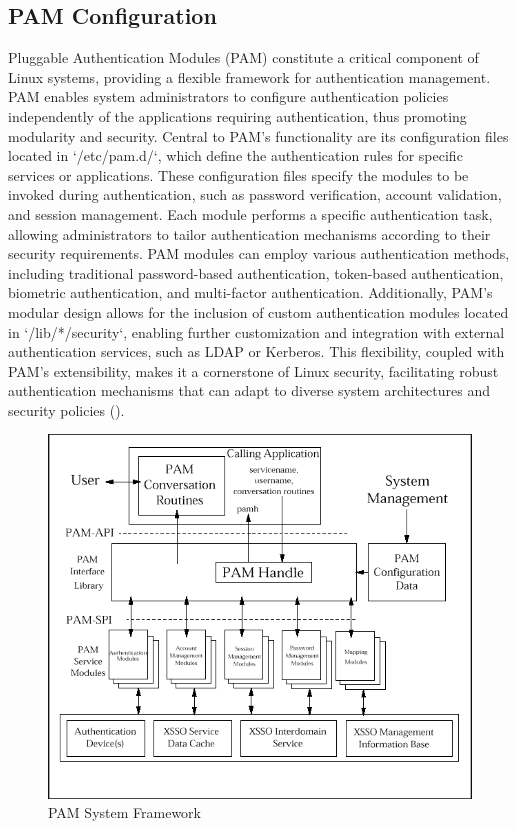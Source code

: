 \documentclass[
]{article}
\begin{document}
\begin{multicols}{2}
\section{PAM Configuration}
Pluggable Authentication Modules (PAM) constitute a critical component of Linux systems, providing a flexible framework for authentication management. PAM enables system administrators to configure authentication policies independently of the applications requiring authentication, thus promoting modularity and security. Central to PAM's functionality are its configuration files located in `/etc/pam.d/`, which define the authentication rules for specific services or applications. These configuration files specify the modules to be invoked during authentication, such as password verification, account validation, and session management. Each module performs a specific authentication task, allowing administrators to tailor authentication mechanisms according to their security requirements. PAM modules can employ various authentication methods, including traditional password-based authentication, token-based authentication, biometric authentication, and multi-factor authentication. Additionally, PAM's modular design allows for the inclusion of custom authentication modules located in `/lib/*/security`, enabling further customization and integration with external authentication services, such as LDAP or Kerberos. This flexibility, coupled with PAM's extensibility, makes it a cornerstone of Linux security, facilitating robust authentication mechanisms that can adapt to diverse system architectures and security policies (\cite{jones2022importance}). 

\end{multicols}

\begin{figure}[htbp]
  \centering
  \includegraphics[width=0.4\linewidth]{pam_configuration.png}
  \caption{PAM System Framework}
\end{figure}
\end{document}
